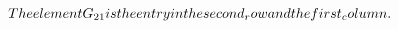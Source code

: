 \documentclass[preview]{standalone}
\begin{document}
\begin{align*}
The element G_{ 2 1 } is the entry in the {\tiny  second_row } and the {\tiny  first_column }.
\end{align*}
\end{document}
